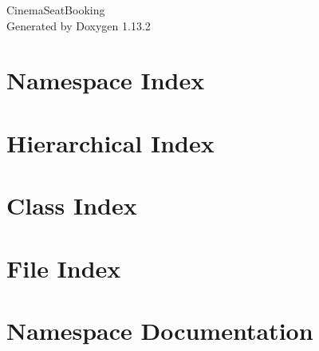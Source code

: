 \documentclass[twoside]{book}
\newcommand{\+}{\discretionary{\mbox{\scriptsize$\hookleftarrow$}}{}{}}
\newcommand{\clearemptydoublepage}{%
    \newpage{\pagestyle{empty}\cleardoublepage}%
  }
\begin{document}
  \raggedbottom
    \hypersetup{pageanchor=false,
                bookmarksnumbered=true,
                pdfencoding=unicode
               }
  \begin{titlepage}
  \vspace*{7cm}
  \begin{center}%
  {\Large Cinema\+Seat\+Booking}\\
  \vspace*{1cm}
  {\large Generated by Doxygen 1.13.2}\\
  \end{center}
  \end{titlepage}
  \clearemptydoublepage
  \tableofcontents
  \clearemptydoublepage
  \hypersetup{pageanchor=true}
\chapter{Namespace Index}

\chapter{Hierarchical Index}

\chapter{Class Index}

\chapter{File Index}

\chapter{Namespace Documentation}






\end{document}
